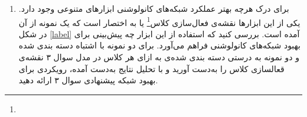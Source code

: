 \begin{enumerate}
	
	\item برای درک هرچه بهتر عملکرد شبکه‌های کانولوشنی ابزار‌های متنوعی وجود دارد. یکی از این ابزار‌ها نقشه‌ی فعال‌سازی کلاس\footnote{} یا به اختصار  است
	که یک نمونه از آن در شکل \ref{label} آمده است. بررسی کنید که استفاده از این ابزار چه پیش‌بینی برای بهبود شبکه‌های کانولوشنی فراهم می‌آورد. برای دو نمونه با اشتباه دسته بندی شده و دو نمونه به درستی دسته بندی شده‌ی به ازای هر کلاس در مدل سوال ۳ نقشه‌ی قعالسازی کلاس را به‌دست آورید و با تحلیل نتایج به‌دست آمده، رویکردی برای بهبود شبکه پیشنهادی سوال ۳ ارائه دهید.

\end{enumerate}


